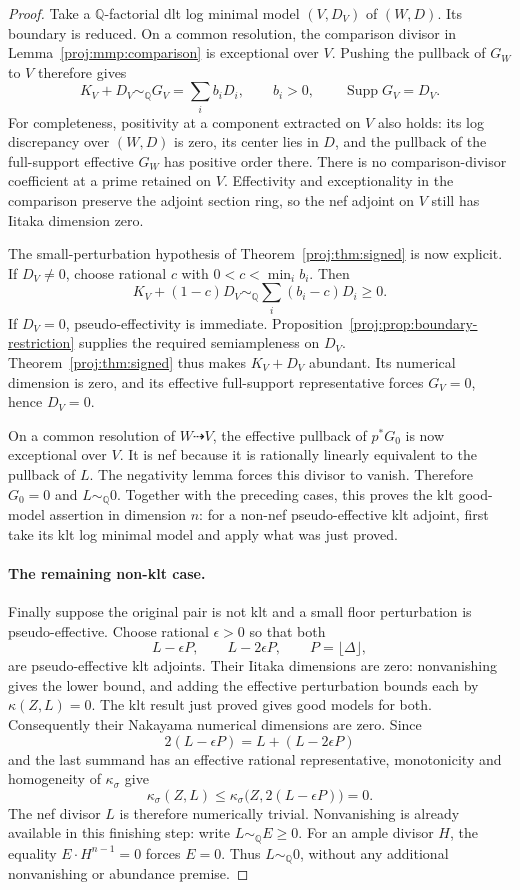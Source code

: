 \documentclass[11pt,letterpaper]{article}
\newcommand{\Q}{\mathbb{Q}}
\DeclareMathOperator{\Supp}{Supp}
\theoremstyle{definition}
\theoremstyle{remark}
\begin{document}
\begin{proof}
Take a \(\Q\)-factorial dlt log minimal model
\((V,D_V)\) of \((W,D)\).
Its boundary is reduced. On a common resolution, the comparison
divisor in Lemma~\ref{proj:mmp:comparison} is exceptional over \(V\).
Pushing the pullback of \(G_W\) to \(V\) therefore gives
\[
 K_V+D_V\sim_{\Q}G_V=\sum_i b_iD_i,\qquad b_i>0,
 \qquad \Supp G_V=D_V.
\]
For completeness, positivity at a component extracted on \(V\)
also holds: its log discrepancy over \((W,D)\) is zero, its
center lies in \(D\), and the pullback of the full-support
effective \(G_W\) has positive order there.
There is no comparison-divisor coefficient at a prime retained
on \(V\).
Effectivity and exceptionality in the comparison preserve the
adjoint section ring, so the nef adjoint on \(V\) still has
Iitaka dimension zero.

The small-perturbation hypothesis of
Theorem~\ref{proj:thm:signed} is now explicit.
If \(D_V\neq 0\), choose rational \(c\) with
\(0<c<\min_i b_i\). Then
\[
 K_V+(1-c)D_V
 \sim_{\Q}\sum_i(b_i-c)D_i\geq 0.
\]
If \(D_V=0\), pseudo-effectivity is immediate.
Proposition~\ref{proj:prop:boundary-restriction} supplies the
required semiampleness on \(D_V\).
Theorem~\ref{proj:thm:signed} thus makes \(K_V+D_V\) abundant.
Its numerical dimension is zero, and its effective
full-support representative forces \(G_V=0\), hence \(D_V=0\).

On a common resolution of \(W\dashrightarrow V\), the effective
pullback of \(p^*G_0\) is now exceptional over \(V\).
It is nef because it is rationally linearly equivalent to the
pullback of \(L\). The negativity lemma forces this divisor
to vanish. Therefore \(G_0=0\) and \(L\sim_{\Q}0\).
Together with the preceding cases, this proves the klt
good-model assertion in dimension \(n\): for a non-nef
pseudo-effective klt adjoint, first take its klt log minimal
model and apply what was just proved.

\paragraph{The remaining non-klt case.}
Finally suppose the original pair is not klt and a small
floor perturbation is pseudo-effective. Choose rational
\(\epsilon>0\) so that both
\[
 L-\epsilon P,\qquad L-2\epsilon P,
 \qquad P=\lfloor\Delta\rfloor,
\]
are pseudo-effective klt adjoints.
Their Iitaka dimensions are zero: nonvanishing gives the lower
bound, and adding the effective perturbation bounds each by
\(\kappa(Z,L)=0\).
The klt result just proved gives good models for both.
Consequently their Nakayama numerical dimensions are zero.
Since
\[
 2(L-\epsilon P)
   =L+(L-2\epsilon P)
\]
and the last summand has an effective rational representative,
monotonicity and homogeneity of \(\kappa_\sigma\) give
\[
 \kappa_\sigma(Z,L)
 \leq\kappa_\sigma\bigl(Z,2(L-\epsilon P)\bigr)=0.
\]
The nef divisor \(L\) is therefore numerically trivial.
Nonvanishing is already available in this finishing step:
write \(L\sim_{\Q}E\geq 0\).
For an ample divisor \(H\), the equality
\(E\cdot H^{n-1}=0\) forces \(E=0\).
Thus \(L\sim_{\Q}0\), without any additional nonvanishing or
abundance premise.


\end{proof}
\end{document}
